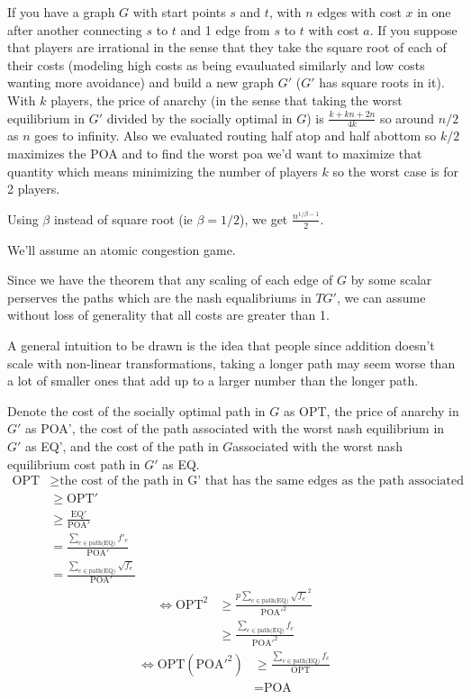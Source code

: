 \documentclass[11pt]{article}
\begin{document}
\textbf{}
If you have a graph $G$ with start points $s$ and $t$, with $n$ edges with cost $x$ in one after another connecting $s$ to $t$ and 1 edge from $s$ to $t$ with cost $a$.  If you suppose that players are irrational in the sense that they take the square root of each of their costs (modeling high costs as being evauluated similarly and low costs wanting more avoidance) and build a new graph $G'$ ($G'$ has square roots in it).  With $k$ players, the price of anarchy (in the sense that taking the worst equilibrium in $G'$ divided by the socially optimal in $G$) is $\frac{k + kn + 2n}{4k}$ so around $n/2$ as $n$ goes to infinity.  Also we evaluated routing half atop and half abottom so $k/2$ maximizes the POA and to find the worst poa we'd want to maximize that quantity which means minimizing the number of players $k$ so the worst case is for 2 players.

Using $\beta$ instead of square root (ie $\beta = 1/2$), we get $\frac{n^{1/\beta - 1}}{2}$.

We'll assume an atomic congestion game. 

Since we have the theorem that any scaling of each edge of $G$ by some scalar perserves the paths which are the nash equalibriums in $TG'$, we can assume without loss of generality that all costs are greater than 1.

A general intuition to be drawn is the idea that people since addition doesn't scale with non-linear transformations, taking a longer path may seem worse than a lot of smaller ones that add up to a larger number than the longer path.

Denote the cost of the socially optimal path in $G$ as OPT, the price of anarchy in $G'$ as POA', the cost of the path associated with the worst nash equilibrium in $G'$ as EQ', and the cost of the path in $G$associated with the worst nash equilibrium cost path in $G'$ as EQ.
\begin{align*}
\text{OPT} &\ge \text{the cost of the path in G' that has the same edges as the path associated with OPT} \\
&\ge \text{OPT}' \\
&\ge \frac{\text{EQ}'}{\text{POA}'} \\
&= \frac{\sum\limits_{e \in \text{path(EQ)}} f'_e}{\text{POA}'} \\
&= \frac{\sum\limits_{e \in \text{path(EQ)}} \sqrt{f_e}}{\text{POA}'}
\end{align*}
\begin{align*}
\iff \text{OPT}^2 &\ge \frac{p{\sum\limits_{e \in \text{path(EQ)}} \sqrt{f_e}}^2}{\text{POA}'^2} \\
&\ge \frac{\sum\limits_{e \in \text{path(EQ)}} f_e }{\text{POA}'^2}
\end{align*}
\begin{align*}
\iff \text{OPT}(\text{POA}'^2) &\ge \frac{\sum\limits_{e \in \text{path(EQ)}} f_e }{\text{OPT}} \\
&= \text{POA}
\end{align*}
\end{document}

